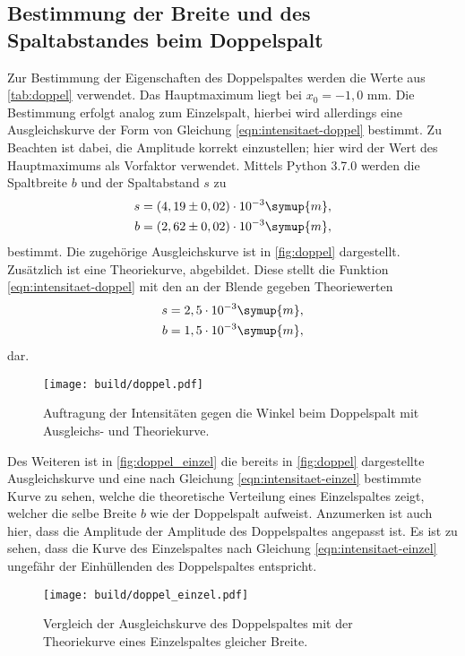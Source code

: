 \subsection{Bestimmung der Breite und des Spaltabstandes beim Doppelspalt}
    Zur Bestimmung der Eigenschaften des Doppelspaltes werden die Werte aus \autoref{tab:doppel} verwendet. Das Hauptmaximum liegt bei 
    $x_0 = -1,0$ mm. Die Bestimmung erfolgt analog zum Einzelspalt, hierbei wird allerdings eine Ausgleichskurve der Form von Gleichung \eqref{eqn:intensitaet-doppel}
    bestimmt. Zu Beachten ist dabei, die Amplitude korrekt einzustellen; hier wird der Wert des Hauptmaximums als Vorfaktor verwendet.
    Mittels Python 3.7.0 werden die Spaltbreite $b$ und der Spaltabstand $s$ zu 
    \begin{align*}
        s &= (4,19 \pm 0,02) \cdot 10^{-3} \symup{m}, \\
        b &= (2,62 \pm 0,02) \cdot 10^{-3} \symup{m},
    \end{align*}
    bestimmt. Die zugehörige Ausgleichskurve ist in \autoref{fig:doppel} dargestellt. Zusätzlich ist eine Theoriekurve, abgebildet. Diese 
    stellt die Funktion \eqref{eqn:intensitaet-doppel} mit den an der Blende gegeben Theoriewerten
    \begin{align*}
        s &= 2,5 \cdot 10^{-3} \symup{m}, \\
        b &= 1,5 \cdot 10^{-3} \symup{m},
    \end{align*}
    dar. 
    
    \begin{figure}
        \centering
        \texttt{[image: build/doppel.pdf]}
        \caption{Auftragung der Intensitäten gegen die Winkel beim Doppelspalt mit Ausgleichs- und Theoriekurve.}
        \label{fig:doppel}
    \end{figure}

    
    Des Weiteren ist in \autoref{fig:doppel_einzel} die bereits in \autoref{fig:doppel} dargestellte Ausgleichskurve und eine nach Gleichung
    \eqref{eqn:intensitaet-einzel} bestimmte Kurve zu sehen, welche die theoretische Verteilung eines Einzelspaltes zeigt, welcher die selbe 
    Breite $b$ wie der Doppelspalt aufweist. Anzumerken ist auch hier, dass die Amplitude der Amplitude des Doppelspaltes angepasst ist.
    Es ist zu sehen, dass die Kurve des Einzelspaltes nach Gleichung \eqref{eqn:intensitaet-einzel} ungefähr der Einhüllenden des Doppelspaltes entspricht.

    \begin{figure}
        \centering
        \texttt{[image: build/doppel\_einzel.pdf]}
        \caption{Vergleich der Ausgleichskurve des Doppelspaltes mit der Theoriekurve eines Einzelspaltes gleicher Breite.}
        \label{fig:doppel_einzel}
    \end{figure}


    